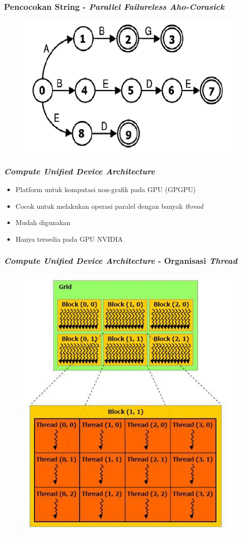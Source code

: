 \documentclass{beamer}
\begin{document}
  \begin{frame}
  \frametitle{Pencocokan String - \emph{Parallel Failureless Aho-Corasick}}
  \begin{figure}
    \includegraphics[width=0.8\linewidth]{../src/resources/pfac.png}
  \end{figure}
  \end{frame}


  \begin{frame}
  \frametitle{\emph{Compute Unified Device Architecture}}
  \begin{itemize}
    \item Platform untuk komputasi non-grafik pada GPU (GPGPU)
    \item Cocok untuk melakukan operasi paralel dengan banyak \emph{thread}
    \item Mudah digunakan
    \item Hanya tersedia pada GPU NVIDIA
  \end{itemize}
  \end{frame}


  \begin{frame}
  \frametitle{\emph{Compute Unified Device Architecture} - Organisasi \emph{Thread}}
  \begin{figure}
    \includegraphics[width=0.5\linewidth]{../src/resources/cudathread.jpg}
  \end{figure}
  \end{frame}
\end{document}
